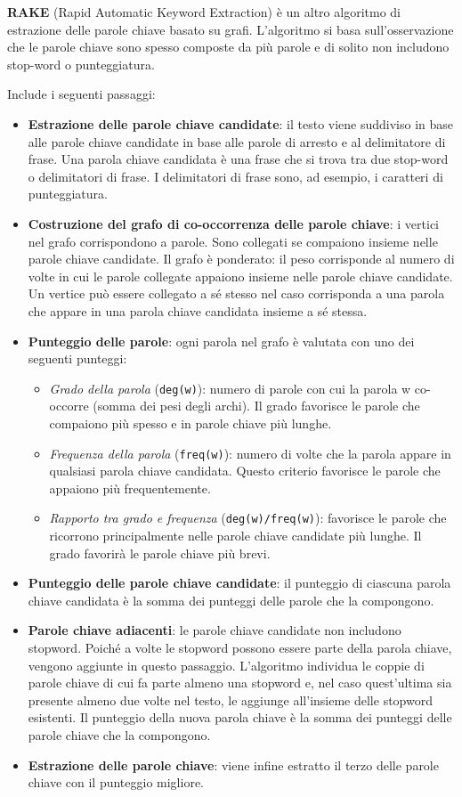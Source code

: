 \textbf{RAKE} (Rapid Automatic Keyword Extraction) è un altro algoritmo di estrazione delle parole chiave basato su grafi. L'algoritmo si basa sull'osservazione che le parole chiave sono spesso composte da più parole e di solito non includono stop-word o punteggiatura.

Include i seguenti passaggi:
\begin{itemize}
\item \textbf{Estrazione delle parole chiave candidate}: il testo viene suddiviso in base alle parole chiave candidate in base alle parole di arresto e al delimitatore di frase. Una parola chiave candidata è una frase che si trova tra due stop-word o delimitatori di frase. I delimitatori di frase sono, ad esempio, i caratteri di punteggiatura.
\item \textbf{Costruzione del grafo di co-occorrenza delle parole chiave}: i vertici nel grafo corrispondono a parole. Sono collegati se compaiono insieme nelle parole chiave candidate. Il grafo è ponderato: il peso corrisponde al numero di volte in cui le parole collegate appaiono insieme nelle parole chiave candidate. Un vertice può essere collegato a sé stesso nel caso corrisponda a una parola che appare in una parola chiave candidata insieme a sé stessa.
\item \textbf{Punteggio delle parole}: ogni parola nel grafo è valutata con uno dei seguenti punteggi: 
\begin{itemize}
\item \textit{Grado della parola} (\texttt{deg(w)}): numero di parole con cui la parola w co-occorre (somma dei pesi degli archi). Il grado favorisce le parole che compaiono più spesso e in parole chiave più lunghe.
\item \textit{Frequenza della parola} (\texttt{freq(w)}): numero di volte che la parola appare in qualsiasi parola chiave candidata. Questo criterio favorisce le parole che appaiono più frequentemente.
\item \textit{Rapporto tra grado e frequenza} (\texttt{deg(w)/freq(w)}): favorisce le parole che ricorrono principalmente nelle parole chiave candidate più lunghe. Il grado favorirà le parole chiave più brevi.
\end{itemize}
\item \textbf{Punteggio delle parole chiave candidate}: il punteggio di ciascuna parola chiave candidata è la somma dei punteggi delle parole che la compongono.
\item \textbf{Parole chiave adiacenti}: le parole chiave candidate non includono stopword. Poiché a volte le stopword possono essere parte della parola chiave, vengono aggiunte in questo passaggio. L'algoritmo individua le coppie di parole chiave di cui fa parte almeno una stopword e, nel caso quest'ultima sia presente almeno due volte nel testo, le aggiunge all'insieme delle stopword esistenti. Il punteggio della nuova parola chiave è la somma dei punteggi delle parole chiave che la compongono.
\item \textbf{Estrazione delle parole chiave}: viene infine estratto il terzo delle parole chiave con il punteggio migliore.
\end{itemize}


